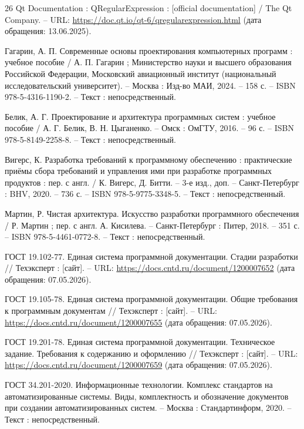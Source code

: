 \begin{thebibliography}{26}
	Qt Documentation : QRegularExpression : [official documentation] / The Qt Company. -- URL: \url{https://doc.qt.io/qt-6/qregularexpression.html} (дата обращения: 13.06.2025).
	
	Гагарин, А. П. Современные основы проектирования компьютерных программ : учебное пособие / А. П. Гагарин ; Министерство науки и высшего образования Российской Федерации, Московский авиационный институт (национальный исследовательский университет). -- Москва : Изд-во МАИ, 2024. -- 158 с. -- ISBN 978-5-4316-1190-2. -- Текст : непосредственный.
	
	Белик, А. Г. Проектирование и архитектура программных систем : учебное пособие / А. Г. Белик, В. Н. Цыганенко. -- Омск : ОмГТУ, 2016. -- 96 с. -- ISBN 978-5-8149-2258-8. -- Текст : непосредственный.
	
	Вигерс, К. Разработка требований к программному обеспечению : практические приёмы сбора требований и управления ими при разработке программных продуктов : пер. с англ. / К. Вигерс, Д. Битти. -- 3-е изд., доп. -- Санкт-Петербург : BHV, 2020. -- 736 с. -- ISBN 978-5-9775-3348-5. -- Текст : непосредственный.
	
	Мартин, Р. Чистая архитектура. Искусство разработки программного обеспечения / Р. Мартин ; пер. с англ. А. Кисилева. -- Санкт-Петербург : Питер, 2018. -- 351 с. -- ISBN 978-5-4461-0772-8. -- Текст : непосредственный.

	ГОСТ 19.102-77. Единая система программной документации. Стадии разработки // Техэксперт : [сайт]. -- URL: \url{https://docs.cntd.ru/document/1200007652} (дата обращения: 07.05.2026).
	
	ГОСТ 19.105-78. Единая система программной документации. Общие требования к программным документам // Техэксперт : [сайт]. -- URL: \url{https://docs.cntd.ru/document/1200007655} (дата обращения: 07.05.2026).
	
	ГОСТ 19.201-78. Единая система программной документации. Техническое задание. Требования к содержанию и оформлению // Техэксперт : [сайт]. -- URL: \url{https://docs.cntd.ru/document/1200007659} (дата обращения: 07.05.2026).
	
	ГОСТ 34.201-2020. Информационные технологии. Комплекс стандартов на автоматизированные системы. Виды, комплектность и обозначение документов при создании автоматизированных систем. -- Москва : Стандартинформ, 2020. -- Текст : непосредственный.
	

\end{thebibliography}
